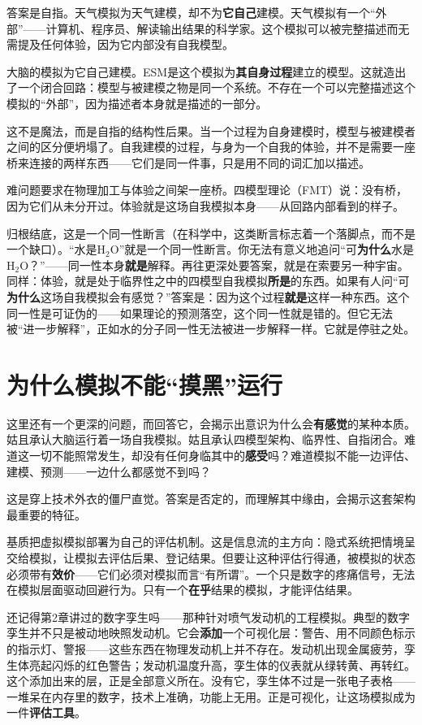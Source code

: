 \documentclass[11pt, twoside, openright]{book}
\begin{document}
答案是自指。天气模拟为天气建模，却不为\textbf{它自己}建模。天气模拟有一个“外部”------计算机、程序员、解读输出结果的科学家。这个模拟可以被完整描述而无需提及任何体验，因为它内部没有自我模型。

大脑的模拟为它自己建模。ESM是这个模拟为\textbf{其自身过程}建立的模型。这就造出了一个闭合回路：模型与被建模之物是同一个系统。不存在一个可以完整描述这个模拟的“外部”，因为描述者本身就是描述的一部分。

这不是魔法，而是自指的结构性后果。当一个过程为自身建模时，模型与被建模者之间的区分便坍塌了。自我建模的过程，与身为一个自我的体验，并不是需要一座桥来连接的两样东西------它们是同一件事，只是用不同的词汇加以描述。

难问题要求在物理加工与体验之间架一座桥。四模型理论（FMT）说：没有桥，因为它们从未分开过。体验就是这场自我模拟本身------从回路内部看到的样子。

归根结底，这是一个同一性断言（在科学中，这类断言标志着一个落脚点，而不是一个缺口）。“水是H$_2$O”就是一个同一性断言。你无法有意义地追问“可\textbf{为什么}水是H$_2$O？”------同一性本身\textbf{就是}解释。再往更深处要答案，就是在索要另一种宇宙。同样：体验，就是处于临界性之中的四模型自我模拟\textbf{所是}的东西。如果有人问“可\textbf{为什么}这场自我模拟会有感觉？”答案是：因为这个过程\textbf{就是}这样一种东西。这个同一性是可证伪的------如果理论的预测落空，这个同一性就是错的。但它无法被“进一步解释”，正如水的分子同一性无法被进一步解释一样。它就是停驻之处。

\section*{为什么模拟不能“摸黑”运行}

这里还有一个更深的问题，而回答它，会揭示出意识为什么会\textbf{有感觉}的某种本质。姑且承认大脑运行着一场自我模拟。姑且承认四模型架构、临界性、自指闭合。难道这一切不能照常发生，却没有任何身临其中的\textbf{感受}吗？难道模拟不能一边评估、建模、预测------一边什么都感觉不到吗？

这是穿上技术外衣的僵尸直觉。答案是否定的，而理解其中缘由，会揭示这套架构最重要的特征。

基质把虚拟模拟部署为自己的评估机制。这是信息流的主方向：隐式系统把情境呈交给模拟，让模拟去评估后果、登记结果。但要让这种评估行得通，被模拟的状态必须带有\textbf{效价}------它们必须对模拟而言“有所谓”。一个只是数字的疼痛信号，无法在模拟层面驱动回避行为。只有一个\textbf{在乎}结果的模拟，才能评估结果。

还记得第2章讲过的数字孪生吗------那种针对喷气发动机的工程模拟。典型的数字孪生并不只是被动地映照发动机。它会\textbf{添加}一个可视化层：警告、用不同颜色标示的指示灯、警报------这些东西在物理发动机上并不存在。发动机出现金属疲劳，孪生体亮起闪烁的红色警告；发动机温度升高，孪生体的仪表就从绿转黄、再转红。这个添加出来的层，正是全部意义所在。没有它，孪生体不过是一张电子表格------一堆呆在内存里的数字，技术上准确，功能上无用。正是可视化，让这场模拟成为一件\textbf{评估工具}。
\end{document}
